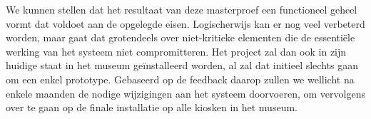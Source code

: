 We kunnen stellen dat het resultaat van deze masterproef een functioneel geheel vormt dat voldoet aan de opgelegde eisen. Logischerwijs kan er nog veel verbeterd worden, maar gaat dat grotendeels over niet-kritieke elementen die de essentiële werking van het systeem niet compromitteren. Het project zal dan ook in zijn huidige staat in het museum geïnstalleerd worden, al zal dat initieel slechts gaan om een enkel prototype. Gebaseerd op de feedback daarop zullen we wellicht na enkele maanden de nodige wijzigingen aan het systeem doorvoeren, om vervolgens over te gaan op de finale installatie op alle kiosken in het museum.

\clearpage


%
%

\listoffigures

\clearpage


%
%

\renewcommand{\lstlistlistingname}{Lijst van fragmenten}
\renewcommand{\lstlistingname}{Fragment}
\lstlistoflistings

\clearpage


%
%





%
%

\newpage
\thispagestyle{empty}
\mbox{}
